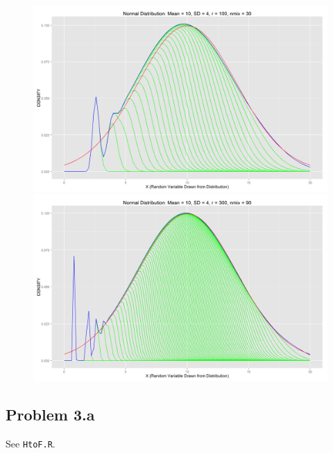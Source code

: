\documentclass[letter]{article}
\begin{document}
\begin{figure}[H]
\includegraphics[scale=.27]{normdist_10_4_100_30.png}\\
\includegraphics[scale=.54]{normdist_10_4_300_90.png}
\end{figure}

\newpage

\subsection*{Problem 3.a}
See \texttt{HtoF.R}. 

\end{document}
